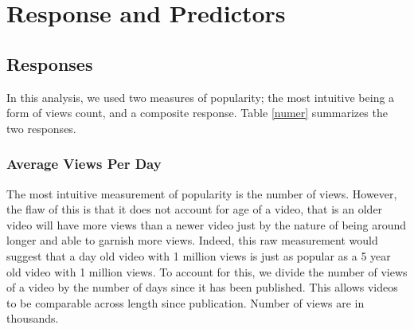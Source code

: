 \section{Response and Predictors}
\subsection{Responses}
In this analysis, we used two measures of popularity; the most intuitive being a form of views count, and a composite response. Table \ref{numer} summarizes the two responses. 
\subsubsection{Average Views Per Day}
The most intuitive measurement of popularity is the number of views. However, the flaw of this is that it does not account for age of a video, that is an older video will have more views than a newer video just by the nature of being around longer and able to garnish more views. Indeed, this raw measurement would suggest that a day old video with 1 million views is just as popular as a 5 year old video with 1 million views. To account for this, we divide the number of views of a video by the number of days since it has been published. This allows videos to be comparable across length since publication. Number of views are in thousands.
